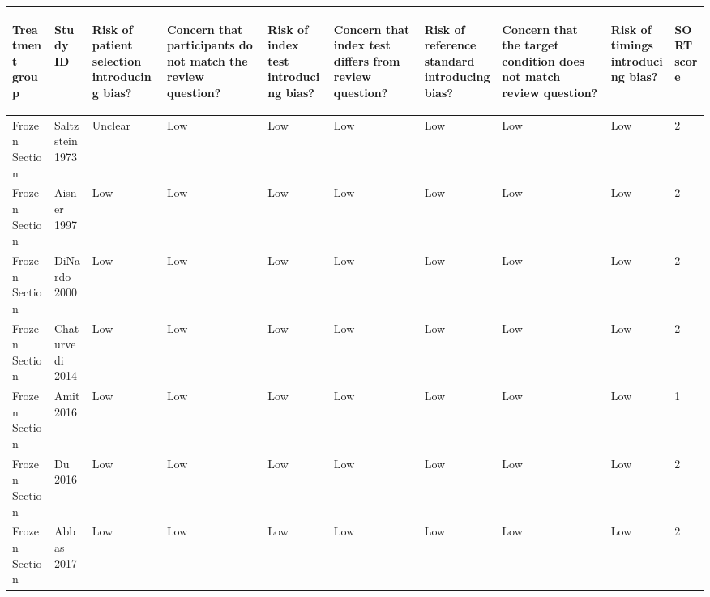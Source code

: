 \begin{table}[ht]
\centering
\begingroup\tiny
\begin{tabular}{llllllllll}
  \hline
\begin{sideways} Treatment group \end{sideways} & \begin{sideways} Study ID \end{sideways} & \begin{sideways} Risk of patient selection introducing bias? \end{sideways} & \begin{sideways} Concern that participants do not match the review question? \end{sideways} & \begin{sideways} Risk of index test introducing bias? \end{sideways} & \begin{sideways} Concern that index test differs from review question? \end{sideways} & \begin{sideways} Risk of reference standard introducing bias? \end{sideways} & \begin{sideways} Concern that the target condition does not match review question? \end{sideways} & \begin{sideways} Risk of timings introducing bias? \end{sideways} & \begin{sideways} SORT score \end{sideways} \\ 
  \hline
Frozen Section & Saltzstein 1973 & Unclear & Low & Low & Low & Low & Low & Low & 2 \\ 
  Frozen Section & Aisner 1997 & Low & Low & Low & Low & Low & Low & Low & 2 \\ 
  Frozen Section & DiNardo 2000 & Low & Low & Low & Low & Low & Low & Low & 2 \\ 
  Frozen Section & Chaturvedi 2014 & Low & Low & Low & Low & Low & Low & Low & 2 \\ 
  Frozen Section & Amit 2016 & Low & Low & Low & Low & Low & Low & Low & 1 \\ 
  Frozen Section & Du 2016 & Low & Low & Low & Low & Low & Low & Low & 2 \\ 
  Frozen Section & Abbas 2017 & Low & Low & Low & Low & Low & Low & Low & 2 \\ 

\end{tabular}
\end{table}
